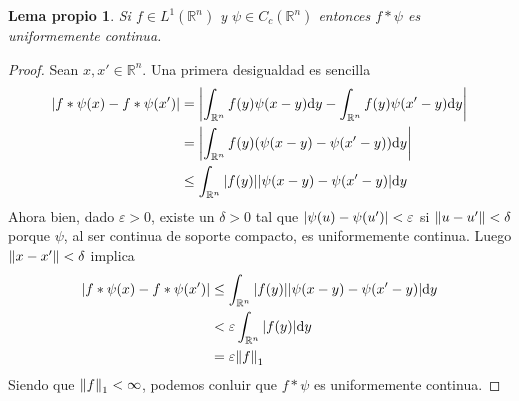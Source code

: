 \documentclass{article}
\newcommand{\realNumbers}{\mathbb{R}}
\newtheorem{myLemma}{Lema propio}
\theoremstyle{remark}
\begin{document}
\begin{myLemma}
  \label{myLemma:convolutionWithCompactlySupportedFunction}
  Si \(f \in L^1(\realNumbers^n)\) y \(\psi \in C_c(\realNumbers^n)\) entonces \(f * \psi\) es uniformemente continua.
\end{myLemma}
\begin{proof}
  Sean \(x, x' \in \realNumbers^n\).
  Una primera desigualdad es sencilla
  \begin{align}
    \abs{f * \psi (x) - f * \psi (x')}
    &=
    \abs{
      \int_{\realNumbers^n} f(y) \psi(x - y) \dd y
      -
      \int_{\realNumbers^n} f(y) \psi(x' - y) \dd y
    }
    \\
    &=
    \abs{
      \int_{\realNumbers^n} f(y) (\psi(x - y) - \psi(x' - y)) \dd y
    }
    \\
    &\leq
    \int_{\realNumbers^n} \abs{f(y)} \abs{\psi(x - y) - \psi(x' - y)} \dd y
  \end{align}
  Ahora bien, dado \(\varepsilon > 0\), existe un \(\delta > 0\) tal que \(\abs{\psi(u) - \psi(u')} < \varepsilon\) si \(\norm{u - u'} < \delta\) porque \(\psi\), al ser continua de soporte compacto, es uniformemente continua.
  Luego \(\norm{x - x'} < \delta\) implica
  \begin{align}
    \abs{f * \psi (x) - f * \psi (x')}
    &\leq
    \int_{\realNumbers^n} \abs{f(y)} \abs{\psi(x - y) - \psi(x' - y)} \dd y
    \\
    &<
    \varepsilon \int_{\realNumbers^n} \abs{f(y)} \dd y
    \\
    &=
    \varepsilon \norm{f}_1
  \end{align}
  Siendo que \(\norm{f}_1 < \infty\), podemos conluir que \(f * \psi\) es uniformemente continua.
\end{proof}
\end{document}
